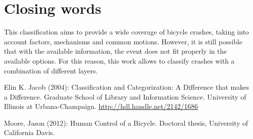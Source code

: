 \documentclass{article}
\begin{document}
\section{Closing words}

This classification aims to provide a wide coverage of bicycle crashes, taking into account factors, mechanisms and common motions.
%
However, it is still possible that with the available information, the event does not fit properly in the available options.
%
For this reason, this work allows to classify crashes with a combination of different layers.



\begin{thebibliography}{9}

     Elin K. Jacob (2004):  Classification and Categorization: A Difference that makes a Difference. Graduate School of Library and Information Science. University of Illinois at Urbana-Champaign. \url{http://hdl.handle.net/2142/1686}

     Moore, Jason (2012): Human Control of a Bicycle. Doctoral thesis, University of California Davis.


\end{thebibliography}
\end{document}
